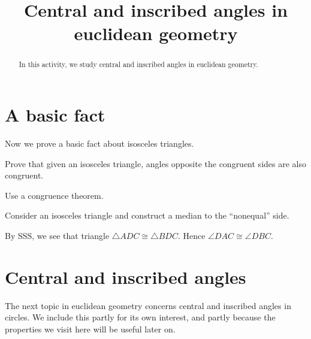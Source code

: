 \documentclass[newpage,hints,handout]{ximera}
\title{Central and inscribed angles in euclidean geometry}
\begin{document}
\begin{abstract}
In this activity, we study central and inscribed angles in euclidean
geometry.
\end{abstract}
\maketitle

\section{A basic fact}
Now we prove a basic fact about isosceles triangles.


\begin{problem}
Prove that given an isosceles triangle, angles opposite the congruent
sides are also congruent.
\begin{hint}
Use a congruence theorem.
\end{hint}
\begin{freeResponse}
Consider an isosceles triangle and construct a median to the
``nonequal'' side.
\begin{image}
\end{image}
By SSS, we see that triangle $\triangle ADC \cong \triangle
BDC$. Hence $\angle DAC \cong \angle DBC$.
\end{freeResponse}
\end{problem}


\section{Central and inscribed angles}

The next topic in euclidean geometry concerns central and inscribed
angles in circles. We include this partly for its own interest, and
partly because the properties we visit here will be useful later on.
\end{document}

